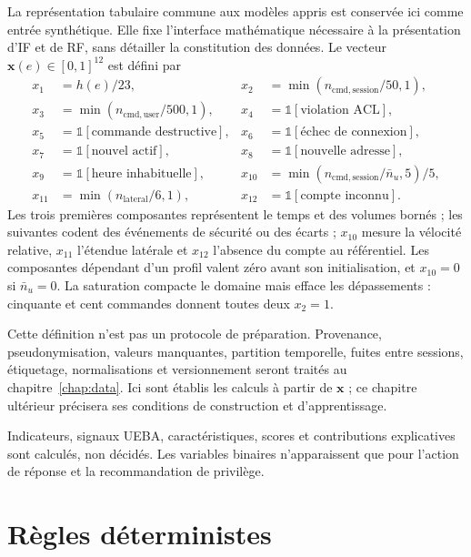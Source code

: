 \documentclass[11pt,a4paper,oneside]{report}
\theoremstyle{definition}
\theoremstyle{plain}
\begin{document}
La représentation tabulaire commune aux modèles appris est conservée ici comme entrée synthétique. Elle fixe l'interface mathématique nécessaire à la présentation d'IF et de RF, sans détailler la constitution des données. Le vecteur $\mathbf{x}(e)\in[0,1]^{12}$ est défini par
\begin{align}
x_1&=h(e)/23, &
x_2&=\min(n_{\mathrm{cmd,session}}/50,1),\nonumber\\
x_3&=\min(n_{\mathrm{cmd,user}}/500,1),&
x_4&=\mathbb{1}[\text{violation ACL}],\nonumber\\
x_5&=\mathbb{1}[\text{commande destructive}],&
x_6&=\mathbb{1}[\text{échec de connexion}],\nonumber\\
x_7&=\mathbb{1}[\text{nouvel actif}],&
x_8&=\mathbb{1}[\text{nouvelle adresse}],\nonumber\\
x_9&=\mathbb{1}[\text{heure inhabituelle}],&
x_{10}&=\min(n_{\mathrm{cmd,session}}/\bar n_u,5)/5,\nonumber\\
x_{11}&=\min(n_{\mathrm{lateral}}/6,1),&
x_{12}&=\mathbb{1}[\text{compte inconnu}].
\label{eq:ai-ro-features}
\end{align}
Les trois premières composantes représentent le temps et des volumes bornés ; les suivantes codent des événements de sécurité ou des écarts ; $x_{10}$ mesure la vélocité relative, $x_{11}$ l'étendue latérale et $x_{12}$ l'absence du compte au référentiel. Les composantes dépendant d'un profil valent zéro avant son initialisation, et $x_{10}=0$ si $\bar n_u=0$. La saturation compacte le domaine mais efface les dépassements : cinquante et cent commandes donnent toutes deux $x_2=1$.

Cette définition n'est pas un protocole de préparation. Provenance, pseudonymisation, valeurs manquantes, partition temporelle, fuites entre sessions, étiquetage, normalisations et versionnement seront traités au chapitre~\ref{chap:data}. Ici sont établis les calculs à partir de $\mathbf{x}$ ; ce chapitre ultérieur précisera ses conditions de construction et d'apprentissage.

Indicateurs, signaux UEBA, caractéristiques, scores et contributions explicatives sont calculés, non décidés. Les variables binaires n'apparaissent que pour l'action de réponse et la recommandation de privilège.

\section{Règles déterministes}
\label{sec:ai-ro-rules}
\end{document}

